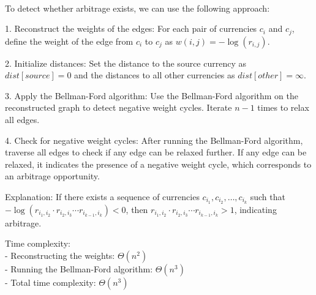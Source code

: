 \begin{solution} \\
    To detect whether arbitrage exists, we can use the following approach:

    1. Reconstruct the weights of the edges: For each pair of currencies $c_i$ and $c_j$, define the weight of the edge from $c_i$ to $c_j$ as $w(i,j) = -\log(r_{i,j})$.

    2. Initialize distances: Set the distance to the source currency as $dist[source] = 0$ and the distances to all other currencies as $dist[other] = \infty$.

    3. Apply the Bellman-Ford algorithm: Use the Bellman-Ford algorithm on the reconstructed graph to detect negative weight cycles. Iterate $n-1$ times to relax all edges.

    4. Check for negative weight cycles: After running the Bellman-Ford algorithm, traverse all edges to check if any edge can be relaxed further. If any edge can be relaxed, it indicates the presence of a negative weight cycle, which corresponds to an arbitrage opportunity.

    Explanation: If there exists a sequence of currencies $c_{i_1}, c_{i_2}, \dots, c_{i_k}$ such that $- \log(r_{i_1, i_2} \cdot r_{i_2, i_3} \cdots r_{i_{k-1}, i_k}) < 0$, then $r_{i_1, i_2} \cdot r_{i_2, i_3} \cdots r_{i_{k-1}, i_k} > 1$, indicating arbitrage.

    Time complexity:\\
    - Reconstructing the weights: $\Theta(n^2)$\\
    - Running the Bellman-Ford algorithm: $\Theta(n^3)$\\
    - Total time complexity: $\Theta(n^3)$\\
\end{solution}